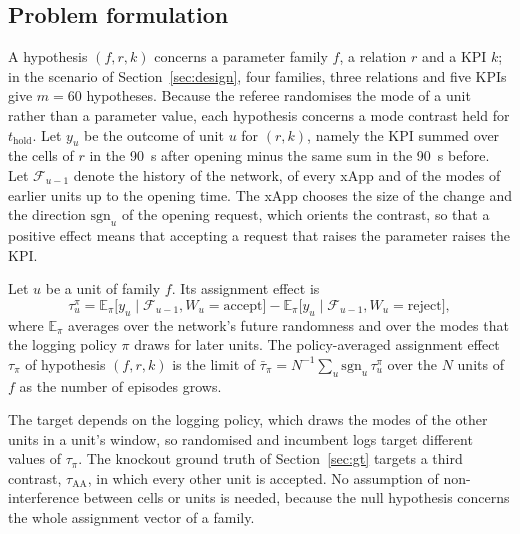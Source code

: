 \subsection{Problem formulation}
\label{sec:estimand}

A hypothesis $(f, r, k)$ concerns a parameter family $f$, a relation $r$ and a KPI $k$; in the scenario of
Section~\ref{sec:design}, four families, three relations and five KPIs give $m = 60$ hypotheses. Because the referee
randomises the mode of a unit rather than a parameter value, each hypothesis concerns a mode contrast held for
$t_{\mathrm{hold}}$.
Let $y_u$ be the outcome of unit $u$ for $(r, k)$, namely the KPI summed over the cells of $r$ in the 90~s after
opening minus the same sum in the 90~s before. Let $\mathcal{F}_{u-1}$ denote the history of the network, of every
xApp and of the modes of earlier units up to the opening time. The xApp chooses the size of the change and the
direction $\mathrm{sgn}_u$ of the opening request, which orients the contrast, so that a positive effect means that
accepting a request that raises the parameter raises the KPI.

\begin{definition}
\label{def:tau_pi}
Let $u$ be a unit of family $f$. Its assignment effect is
\begin{equation}
\tau_u^{\pi} = \mathbb{E}_{\pi}\bigl[y_u \mid \mathcal{F}_{u-1}, W_u = \text{accept}\bigr]
             - \mathbb{E}_{\pi}\bigl[y_u \mid \mathcal{F}_{u-1}, W_u = \text{reject}\bigr],
\label{eq:tau_u}
\end{equation}
where $\mathbb{E}_{\pi}$ averages over the network's future randomness and over the modes that the logging policy
$\pi$ draws for later units. The policy-averaged assignment effect $\tau_{\pi}$ of hypothesis $(f, r, k)$ is the
limit of $\bar\tau_{\pi} = N^{-1} \sum_u \mathrm{sgn}_u\, \tau_u^{\pi}$ over the $N$ units of $f$ as the number of
episodes grows.
\end{definition}

The target depends on the logging policy, which draws the modes of the other units in a unit's window, so randomised
and incumbent logs target different values of $\tau_{\pi}$. The knockout ground truth of Section~\ref{sec:gt} targets
a third contrast, $\tau_{\mathrm{AA}}$, in which every other unit is accepted. No
assumption of non-interference between cells or units is needed, because the null hypothesis concerns the whole
assignment vector of a family.


